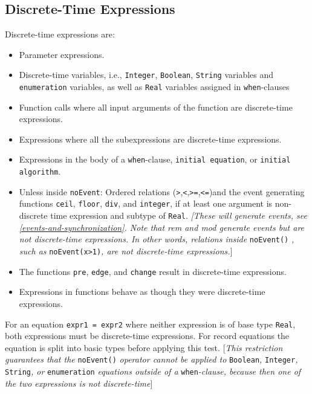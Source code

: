 \subsection{Discrete-Time Expressions}

Discrete-time expressions are:

\begin{itemize}
\item
  Parameter expressions.
\item
  Discrete-time variables, i.e., \lstinline!Integer!, \lstinline!Boolean!, \lstinline!String! variables and
  \lstinline!enumeration! variables, as well as \lstinline!Real! variables assigned in
  \lstinline!when!-clauses
\item
  Function calls where all input arguments of the function are
  discrete-time expressions.
\item
  Expressions where all the subexpressions are discrete-time
  expressions.
\item
  Expressions in the body of a \lstinline!when!-clause, \lstinline!initial equation!, or \lstinline!initial algorithm!.
\item
  Unless inside \lstinline!noEvent!: Ordered relations
  (\lstinline!>!,\lstinline!<!,\lstinline!>=!,\lstinline!<=!)and the event
  generating functions \lstinline!ceil!, \lstinline!floor!, \lstinline!div!, and \lstinline!integer!, if at least one
  argument is non-discrete time expression and subtype of \lstinline!Real!.
  \emph{{[}These will generate events, see \autoref{events-and-synchronization}. Note that
  rem and mod generate events but are not discrete-time expressions.}
  \emph{In other words, relations inside} \lstinline!noEvent()! \emph{, such as}
  \lstinline!noEvent(x>1)!\emph{, are not discrete-time
  expressions.}{]}
\item
  The functions \lstinline!pre!, \lstinline!edge!, and \lstinline!change! result in discrete-time
  expressions.
\item
  Expressions in functions behave as though they were discrete-time
  expressions.
\end{itemize}

For an equation \lstinline!expr1 = expr2! where neither expression is of base type
\lstinline!Real!, both expressions must be discrete-time expressions. For record
equations the equation is split into basic types before applying this
test. {[}\emph{This restriction guarantees that the} \lstinline!noEvent()!
\emph{operator cannot be applied to} \lstinline!Boolean!\emph{,} \lstinline!Integer!\emph{,}
\lstinline!String!\emph{, or} \lstinline!enumeration! \emph{equations outside of a} \lstinline!when!\emph{-clause, because
then one of the two expressions is not discrete-time}{]}


